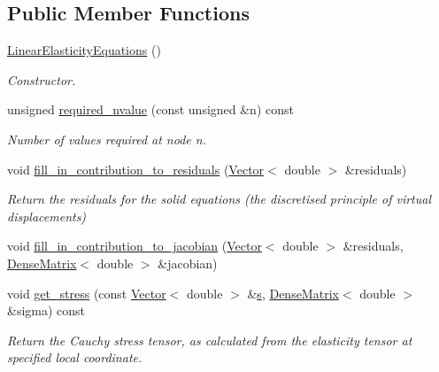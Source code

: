 \subsection*{Public Member Functions}
\begin{DoxyCompactItemize}
\item 
\hyperlink{classoomph_1_1LinearElasticityEquations_adba9f0b6b22592ff24cdefc02bb57c7f}{Linear\+Elasticity\+Equations} ()
\begin{DoxyCompactList}\small\item\em Constructor. \end{DoxyCompactList}\item 
unsigned \hyperlink{classoomph_1_1LinearElasticityEquations_a1a7c0ad418431d47239c933fbdeb0c4b}{required\+\_\+nvalue} (const unsigned \&n) const
\begin{DoxyCompactList}\small\item\em Number of values required at node n. \end{DoxyCompactList}\item 
void \hyperlink{classoomph_1_1LinearElasticityEquations_aeab94f9942f6f8002b49ee3859733a91}{fill\+\_\+in\+\_\+contribution\+\_\+to\+\_\+residuals} (\hyperlink{classoomph_1_1Vector}{Vector}$<$ double $>$ \&residuals)
\begin{DoxyCompactList}\small\item\em Return the residuals for the solid equations (the discretised principle of virtual displacements) \end{DoxyCompactList}\item 
void \hyperlink{classoomph_1_1LinearElasticityEquations_ad09269e02262abfaae2176048066365b}{fill\+\_\+in\+\_\+contribution\+\_\+to\+\_\+jacobian} (\hyperlink{classoomph_1_1Vector}{Vector}$<$ double $>$ \&residuals, \hyperlink{classoomph_1_1DenseMatrix}{Dense\+Matrix}$<$ double $>$ \&jacobian)
\item 
void \hyperlink{classoomph_1_1LinearElasticityEquations_a9d3ccf59b001a53e53e74a1ae429d6b7}{get\+\_\+stress} (const \hyperlink{classoomph_1_1Vector}{Vector}$<$ double $>$ \&\hyperlink{cfortran_8h_ab7123126e4885ef647dd9c6e3807a21c}{s}, \hyperlink{classoomph_1_1DenseMatrix}{Dense\+Matrix}$<$ double $>$ \&sigma) const
\begin{DoxyCompactList}\small\item\em Return the Cauchy stress tensor, as calculated from the elasticity tensor at specified local coordinate. \end{DoxyCompactList}\item 

\end{DoxyCompactItemize}
